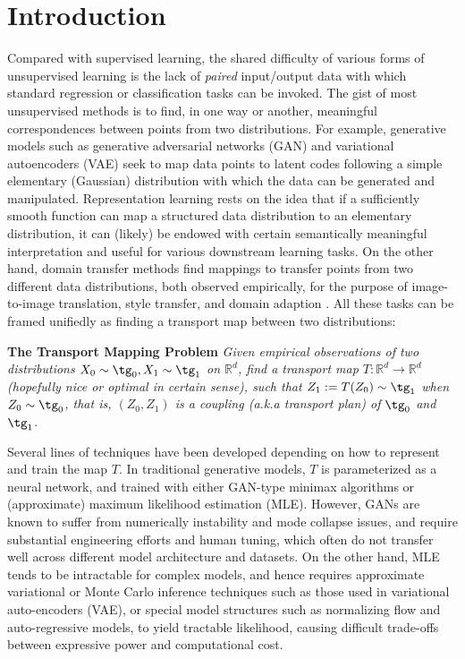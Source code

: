 \documentclass[11pt]{article}
\newcommand{\RR}{\mathbb{R}}
\newcommand{\defeq}{:=}
\begin{document}
\section{Introduction} 

Compared with supervised learning, 
the shared difficulty of various forms of unsupervised learning is the lack of 
\emph{paired} input/output data  
with which standard regression or classification tasks can be invoked. 
The gist of 
most unsupervised methods is to 
find, in one way or another,  meaningful correspondences between 
points from two distributions. 
For example, generative models such as 
generative adversarial networks (GAN) 
and variational autoencoders (VAE) 
\cite[e.g.,][]{goodfellow2014generative, kingma2013auto, dinh2016density}
seek to 
map data points 
to latent codes 
following 
a simple elementary (Gaussian) distribution
with which the data can be generated and manipulated. 
Representation learning 
rests on the idea that 
if a sufficiently smooth function can map
a structured data distribution to an elementary 
distribution, it can (likely) be endowed 
with certain  semantically meaningful interpretation
and useful for various downstream learning tasks.  
On the other hand, 
domain transfer methods 
find mappings to transfer points 
from two different data distributions, 
both observed empirically, 
for the purpose of image-to-image translation,  %
style transfer, and domain adaption \citep[e.g.,][]{cyclegan, flamary2016optimal, trigila2016data, peyre2019computational}.
All these tasks can be framed  unifiedly %
as finding a transport map between two distributions: 

\noindent\textbf{The Transport Mapping Problem}  
\emph{Given empirical observations 
of two distributions $X_0\sim \tg_0,  X_1\sim \tg_1$ on $\RR^d$, 
find a %
transport map $T\colon\RR^d\to\RR^d$ (hopefully nice or optimal in certain sense),  
such that $Z_1 \defeq T(Z_0)\sim \tg_1$ when $Z_0 \sim \tg_0$, that is, $(Z_0,Z_1)$ is a coupling (a.k.a transport plan) of $\tg_0$ and $\tg_1$.  
}



Several lines of techniques have been developed depending on how to  represent and train  the map $T$. 
In traditional generative models, 
$T$ 
is parameterized as a neural network, 
and trained with either 
GAN-type minimax algorithms or (approximate) maximum likelihood estimation (MLE).  
However, GANs are known to suffer from numerically instability  and mode collapse issues,  
and require substantial engineering efforts 
and human tuning, which often do not transfer well across different model architecture and datasets.  
On the other hand, MLE tends to be intractable for complex models, 
and hence
requires 
approximate variational or Monte Carlo inference techniques  
such as those used in variational auto-encoders (VAE), 
or special model structures  
such as normalizing flow and auto-regressive models, to yield tractable likelihood, causing  difficult trade-offs between expressive power and computational cost. %
\end{document}
